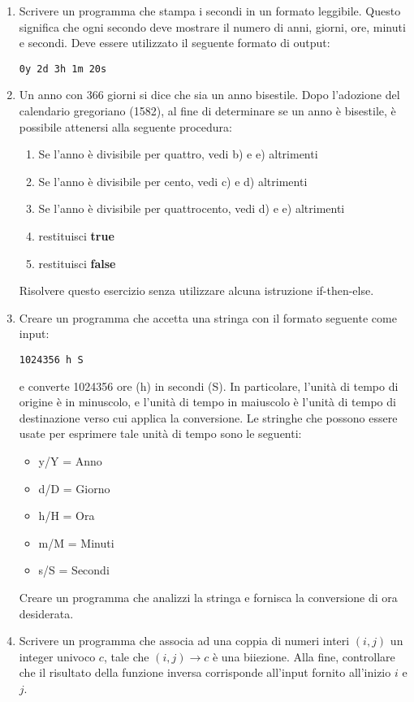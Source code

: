 \documentclass[]{scrartcl}
\begin{document}
\begin{enumerate}
\item Scrivere un programma che stampa i secondi in un formato leggibile. Questo significa che ogni secondo deve mostrare il numero di anni, giorni, ore, minuti e secondi. Deve essere utilizzato il seguente formato di output:
\begin{center}
\texttt{0y 2d 3h 1m 20s}
\end{center}
\item Un anno con 366 giorni si dice che sia un anno bisestile. Dopo l'adozione del calendario gregoriano (1582), al fine di determinare se un anno è bisestile, è possibile attenersi alla seguente procedura:
\begin{enumerate}
\item Se l'anno è divisibile per quattro, vedi b) e e) altrimenti
\item Se l'anno è divisibile per cento, vedi c) e d) altrimenti
\item Se l'anno è divisibile per quattrocento, vedi d) e e) altrimenti
\item restituisci \textbf{true}
\item restituisci \textbf{false}
\end{enumerate}
Risolvere questo esercizio senza utilizzare alcuna istruzione if-then-else.

\item Creare un programma che accetta una stringa con il formato seguente come input:
\begin{center}
	\texttt{1024356 h S}
\end{center}
e converte 1024356 ore (h) in secondi (S). In particolare, l'unità di tempo di origine è in minuscolo, e l'unità di tempo in maiuscolo è l'unità di tempo di destinazione verso cui applica la conversione. Le stringhe che possono essere usate per esprimere tale unità di tempo sono le seguenti:
\begin{itemize}
\item y/Y = Anno
\item d/D = Giorno
\item  h/H = Ora
\item  m/M = Minuti
\item  s/S = Secondi
\end{itemize}
Creare un programma che analizzi la stringa e fornisca la conversione di ora desiderata.

\item  Scrivere un programma che associa ad una coppia di numeri interi $(i, j)$ un integer univoco 
$c$, tale che $(i,j)\to c$ è una biiezione. Alla fine, controllare che il risultato della funzione inversa corrisponde all'input fornito all'inizio $i$ e $j$.


\end{enumerate}
\end{document}

